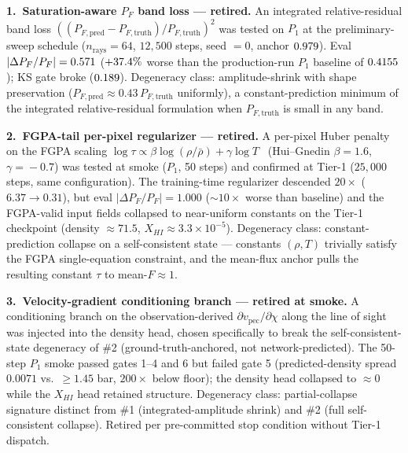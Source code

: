 \textbf{1.\ Saturation-aware $P_F$ band loss --- retired.} An integrated relative-residual band loss $((P_{F,\text{pred}}-P_{F,\text{truth}})/P_{F,\text{truth}})^2$ was tested on $P_1$ at the preliminary-sweep schedule ($n_{\text{rays}}=64$, $12{,}500$ steps, seed $=0$, anchor $0.979$). Eval $|\Delta P_F/P_F|=0.571$ ($+37.4\%$ worse than the production-run $P_1$ baseline of $0.4155$); KS gate broke ($0.189$). Degeneracy class: amplitude-shrink with shape preservation ($P_{F,\text{pred}}\!\approx\!0.43\,P_{F,\text{truth}}$ uniformly), a constant-prediction minimum of the integrated relative-residual formulation when $P_{F,\text{truth}}$ is small in any band.

\textbf{2.\ FGPA-tail per-pixel regularizer --- retired.} A per-pixel Huber penalty on the FGPA scaling $\log\tau \propto \beta\log(\rho/\bar\rho)+\gamma\log T$~\cite{bi_davidsen1997,hui_gnedin1997} (Hui--Gnedin $\beta\!=\!1.6$, $\gamma\!=\!-0.7$) was tested at smoke ($P_1$, 50 steps) and confirmed at Tier-1 ($25{,}000$ steps, same configuration). The training-time regularizer descended $20\times$ ($6.37 \to 0.31$), but eval $|\Delta P_F/P_F| = 1.000$ ($\sim\!10\times$ worse than baseline) and the FGPA-valid input fields collapsed to near-uniform constants on the Tier-1 checkpoint (density $\approx 71.5$, $X_{HI}\!\approx\!3.3\!\times\!10^{-5}$). Degeneracy class: constant-prediction collapse on a self-consistent state --- constants $(\rho, T)$ trivially satisfy the FGPA single-equation constraint, and the mean-flux anchor pulls the resulting constant $\tau$ to mean-$F\!\approx\!1$.

\textbf{3.\ Velocity-gradient conditioning branch --- retired at smoke.} A conditioning branch on the observation-derived $\partial v_{\text{pec}}/\partial \chi$ along the line of sight was injected into the density head, chosen specifically to break the self-consistent-state degeneracy of \#2 (ground-truth-anchored, not network-predicted). The 50-step $P_1$ smoke passed gates 1--4 and 6 but failed gate 5 (predicted-density spread $0.0071$ vs.\ $\geq 1.45$ bar, $200\times$ below floor); the density head collapsed to $\approx 0$ while the $X_{HI}$ head retained structure. Degeneracy class: partial-collapse signature distinct from \#1 (integrated-amplitude shrink) and \#2 (full self-consistent collapse). Retired per pre-committed stop condition without Tier-1 dispatch.

